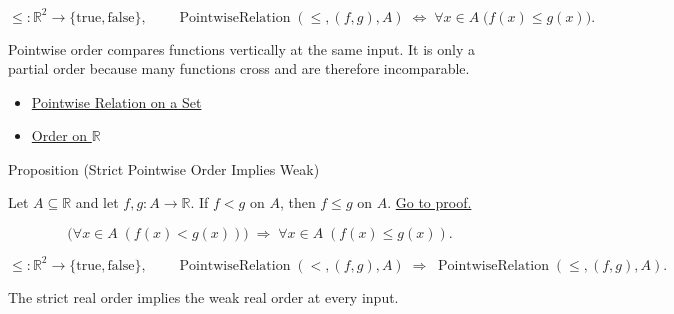\begin{remark*}
\[
  \leq\colon \mathbb{R}^2\to\{\mathrm{true},\mathrm{false}\},\qquad
  \operatorname{PointwiseRelation}(\leq,(f,g),A)
  \;\Longleftrightarrow\;
  \forall x\in A\;\bigl(f(x)\leq g(x)\bigr).
\]
\end{remark*}

\begin{remark*}[Interpretation]
Pointwise order compares functions vertically at the same input.  It is only a
partial order because many functions cross and are therefore incomparable.
\end{remark*}

\begin{dependencies}
\begin{itemize}
  \item \hyperref[def:pointwise-relation-on-set]{Pointwise Relation on a Set}
  \item \hyperref[def:order-on-r]{Order on \(\mathbb{R}\)}
\end{itemize}
\end{dependencies}

\begin{propositionbox}{Proposition (Strict Pointwise Order Implies Weak)}
\begin{proposition}
\label{prop:strict-pointwise-order-implies-weak}
Let \(A\subseteq\mathbb{R}\) and let \(f,g:A\to\mathbb{R}\).  If
\(f<g\) on \(A\), then \(f\leq g\) on \(A\).
\hyperref[prf:strict-pointwise-order-implies-weak]{Go to proof.}
\end{proposition}
\end{propositionbox}

\begin{remark*}
\[
  \bigl(\forall x\in A\;(f(x)<g(x))\bigr)
  \;\Longrightarrow\;
  \forall x\in A\;(f(x)\leq g(x)).
\]
\end{remark*}

\begin{remark*}
\[
  \leq\colon \mathbb{R}^2\to\{\mathrm{true},\mathrm{false}\},\qquad
  \operatorname{PointwiseRelation}(<,(f,g),A)
  \;\Longrightarrow\;
  \operatorname{PointwiseRelation}(\leq,(f,g),A).
\]
\end{remark*}

\begin{remark*}[Interpretation]
The strict real order implies the weak real order at every input.
\end{remark*}

